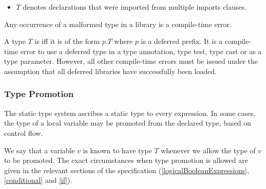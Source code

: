 \documentclass[makeidx]{article}
\begin{document}
{\begin{itemize}

  \noindent
  or of the form



  \noindent
  where each $x_j$ which is not a named parameter may be omitted,
  and $T_j$ is malformed for some $j \in 0 .. n$,
  or $B_j$ is malformed for some $j \in 1 .. m$.
\item
  $T$ denotes declarations that were imported from multiple imports clauses.
\end{itemize}

\LMHash{}%
Any occurrence of a malformed type in a library is a compile-time error.

\LMHash{}%
A type $T$ is 
if{}f it is of the form $p.T$ where $p$ is a deferred prefix.
It is a compile-time error to use a deferred type
in a type annotation, type test, type cast or as a type parameter.
However, all other compile-time errors must be issued
under the assumption that all deferred libraries have successfully been loaded.



\subsubsection{Type Promotion}

\LMHash{}%
The static type system ascribes a static type to every expression.
In some cases, the type of a local variable
may be promoted from the declared type, based on control flow.

\LMHash{}%
We say that a variable $v$ is known to have type $T$
whenever we allow the type of $v$ to be promoted.
The exact circumstances when type promotion is allowed are given in
the relevant sections of the specification
(\ref{logicalBooleanExpressions}, \ref{conditional} and \ref{if}).

}
\end{document}
